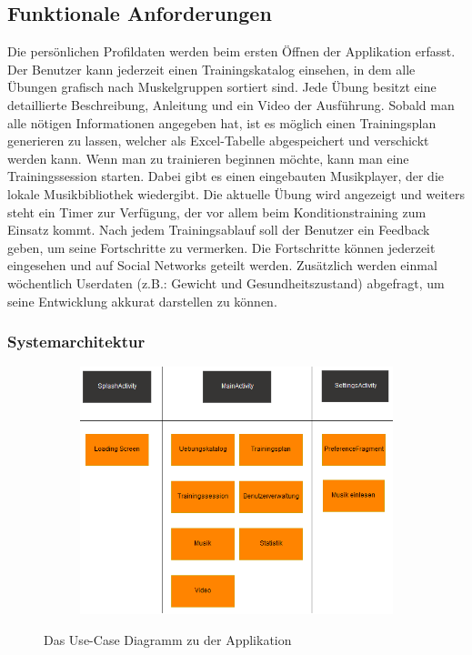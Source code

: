 \documentclass[FIPLY_base.tex]{subfiles}
\begin{document}
	\subsection{Funktionale Anforderungen}
	Die persönlichen Profildaten werden beim ersten Öffnen der Applikation erfasst. Der Benutzer kann jederzeit einen Trainingskatalog einsehen, in dem alle Übungen grafisch nach Muskelgruppen sortiert sind. Jede Übung besitzt eine detaillierte Beschreibung, Anleitung und ein Video der Ausführung. Sobald man alle nötigen Informationen angegeben hat, ist es möglich einen Trainingsplan generieren zu lassen, welcher  als Excel-Tabelle abgespeichert und verschickt werden kann. Wenn man zu trainieren beginnen möchte, kann man eine Trainingssession starten. Dabei gibt es einen eingebauten Musikplayer, der die lokale Musikbibliothek wiedergibt. Die aktuelle Übung wird angezeigt und weiters steht ein Timer zur Verfügung, der vor allem beim Konditionstraining zum Einsatz kommt. Nach jedem Trainingsablauf soll der Benutzer ein Feedback geben, um seine Fortschritte zu vermerken. Die Fortschritte können jederzeit eingesehen und auf Social Networks geteilt werden. Zusätzlich werden einmal wöchentlich Userdaten (z.B.: Gewicht und Gesundheitszustand) abgefragt, um seine Entwicklung akkurat darstellen zu können.
	
	\subsubsection{Systemarchitektur}
	\begin{figure}[H]
		\begin{subfigure}[b]{0.3\textwidth}
			\centering
			\includegraphics[scale=0.85]{img/Systemarchitektur}
		\end{subfigure}
		\caption{Das Use-Case Diagramm zu der Applikation}
	\end{figure}
	\newpage
\end{document}
